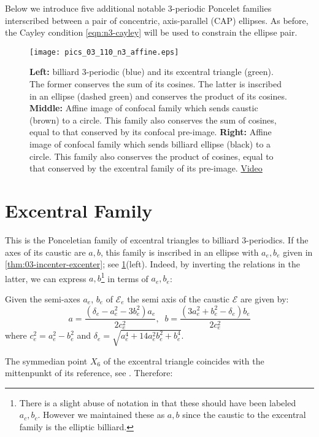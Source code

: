 Below we introduce five additional notable 3-periodic Poncelet families interscribed between a pair of concentric, axis-parallel (CAP) ellipses. As before, the Cayley condition \cref{eqn:n3-cayley} will be used to constrain the ellipse pair. 

\begin{figure}
    \centering
    \texttt{[image: pics\_03\_110\_n3\_affine.eps]}
    \caption{\textbf{Left:} billiard 3-periodic (blue) and its excentral triangle (green). The former conserves the sum of its cosines. The latter is inscribed in an ellipse (dashed green) and conserves the product of its cosines. \textbf{Middle:} Affine image of confocal family which sends caustic (brown) to a circle. This family also conserves the sum of cosines, equal to that conserved by its confocal pre-image. \textbf{Right:} Affine image of confocal family which sends billiard ellipse (black) to a circle. This family also conserves the product of cosines, equal to that conserved by the excentral family of its pre-image. \href{https://youtu.be/HjBZdrR3Azs}{Video}}
    \label{fig:03-n3-affine}
\end{figure}

\section{Excentral Family}

This is the Ponceletian family of excentral triangles to billiard 3-periodics. If the axes of its caustic are $a,b$, this family is inscribed in an ellipse with $a_e,b_e$ given in \cref{thm:03-incenter-excenter}; see \cref{fig:03-n3-affine}(left). Indeed, by inverting the relations in the latter, we can express $a,b$\footnote{There is a slight abuse of notation in that these should have been labeled $a_c,b_c$. However we maintained these as $a,b$ since the caustic to the excentral family is the elliptic billiard.} in terms of $a_e,b_e$:

\begin{proposition}
Given the semi-axes $a_e$, $b_e$ of $\mathcal{E}_e$ the semi axis of the caustic $\mathcal{E}$ are given by:
\[a=\frac{(\delta_e- a_e^2 - 3b_e^2) a_e}{2 c_e^2},\;\; b=\frac{(3a_e^2 + b_e^2 - \delta_e)b_e}{2 c_e^2}\]
where $c_e^2=a_e^2-b_e^2$ and $  \delta_e=\sqrt{a_e^4 + 14a_e^2b_e^2 + b_e^4}$.
\label{prop:03-excentral-caustic}
\end{proposition}

The symmedian point $X_6$ of the excentral triangle coincides with the mittenpunkt of its reference, see \cite[X(6)]{etc}. Therefore:


